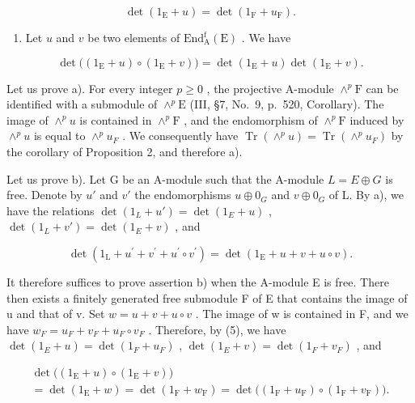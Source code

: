 \[
\det (1 _ {\mathrm{E}} + u) = \det (1 _ {\mathrm{F}} + u _ {\mathrm{F}}).\tag{5}
\]

\begin{enumerate}
\def\labelenumi{\alph{enumi})}
\setcounter{enumi}{1}
\tightlist
\item
  Let \(u\) and \(v\) be two elements of \(\mathrm{End}_{\mathrm{A}}^{\mathrm{f}}(\mathrm{E})\) . We have
\end{enumerate}

\[
\det \bigl ((1 _ {\mathrm{E}} + u) \circ (1 _ {\mathrm{E}} + v) \bigr) = \det (1 _ {\mathrm{E}} + u) \det (1 _ {\mathrm{E}} + v).\tag{6}
\]

Let us prove a). For every integer \(p \geqslant 0\) , the projective A-module \(\wedge^p\mathrm{F}\) can be identified with a submodule of \(\wedge^p\mathrm{E}\) (III, §7, No.~9, p.~520, Corollary). The image of \(\wedge^p u\) is contained in \(\wedge^p\mathrm{F}\) , and the endomorphism of \(\wedge^p\mathrm{F}\) induced by \(\wedge^{p}u\) is equal to \(\wedge^{p}u_{F}\) . We consequently have \(\operatorname{Tr}(\wedge^{p}u)=\operatorname{Tr}(\wedge^{p}u_{F})\) by the corollary of Proposition 2, and therefore a).

Let us prove b). Let G be an A-module such that the A-module \(L = E \oplus G\) is free. Denote by \(u'\) and \(v'\) the endomorphisms \(u \oplus 0_{G}\) and \(v \oplus 0_{G}\) of L. By a), we have the relations \(\det(1_{L} + u') = \det(1_{E} + u)\) , \(\det(1_{L} + v') = \det(1_{E} + v)\) , and

\[
\det (1 _ {\mathrm{L}} + u ^ {\prime} + v ^ {\prime} + u ^ {\prime} \circ v ^ {\prime}) = \det (1 _ {\mathrm{E}} + u + v + u \circ v).
\]

It therefore suffices to prove assertion b) when the A-module E is free. There then exists a finitely generated free submodule F of E that contains the image of u and that of v. Set \(w = u + v + u \circ v\) . The image of w is contained in F, and we have \(w_{F} = u_{F} + v_{F} + u_{F} \circ v_{F}\) . Therefore, by (5), we have \(\det(1_{E} + u) = \det(1_{F} + u_{F})\) , \(\det(1_{E} + v) = \det(1_{F} + v_{F})\) , and

\[
\begin{array}{c} \det \bigl ((1 _ {\mathrm{E}} + u) \circ (1 _ {\mathrm{E}} + v) \bigr) \\ = \det (1 _ {\mathrm{E}} + w) = \det (1 _ {\mathrm{F}} + w _ {\mathrm{F}}) = \det \bigl ((1 _ {\mathrm{F}} + u _ {\mathrm{F}}) \circ (1 _ {\mathrm{F}} + v _ {\mathrm{F}}) \bigr). \end{array}
\]

